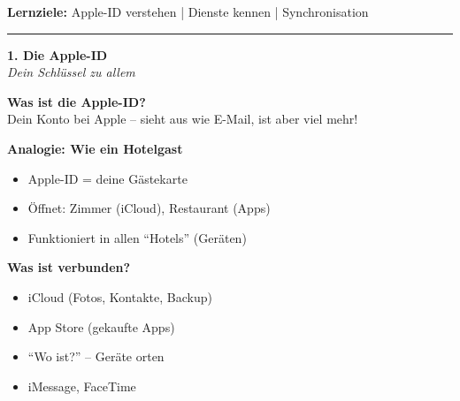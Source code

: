 \documentclass[a4paper,landscape,8pt]{extarticle}
\begin{document}

 \hfill
{\footnotesize\textbf{Lernziele:} Apple-ID verstehen | Dienste kennen | Synchronisation}

\vspace{1mm}
\hrule
\vspace{1mm}

\begin{minipage}[t]{0.32\linewidth}
\begin{center}
\colorbox{appleblue!15}{%
\begin{minipage}{0.95\linewidth}
\vspace{2mm}
\begin{center}
{\Large\bfseries\textcolor{appleblue}{1. Die Apple-ID}}\\[1pt]
{\footnotesize\itshape Dein Schlüssel zu allem}
\end{center}
\vspace{2mm}
\end{minipage}%
}
\end{center}

\vspace{1mm}

\textbf{Was ist die Apple-ID?}\\
Dein Konto bei Apple -- sieht aus wie E-Mail, ist aber viel mehr!

\textbf{Analogie: Wie ein Hotelgast}
\begin{itemize}
\item Apple-ID = deine Gästekarte
\item Öffnet: Zimmer (iCloud), Restaurant (Apps)
\item Funktioniert in allen ``Hotels'' (Geräten)
\end{itemize}

\textbf{Was ist verbunden?}
\begin{itemize}
\item iCloud (Fotos, Kontakte, Backup)
\item App Store (gekaufte Apps)
\item ``Wo ist?'' -- Geräte orten
\item iMessage, FaceTime
\end{itemize}

\vspace{2mm}

\end{minipage}%
\end{document}
